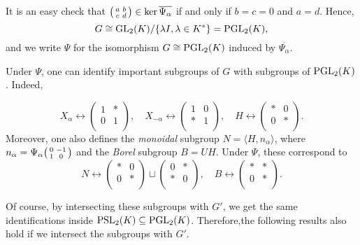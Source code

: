 It is an easy check that $\begin{psmallmatrix}
    a & b\\
    c & d\\
\end{psmallmatrix}\in\ker\overline{\Psi_\alpha}$ if and only if $b=c=0$ and $a=d$. Hence, $$G\cong\mathrm{GL}_2(K)/\{\lambda I,\lambda\in K^*\}=\mathrm{PGL}_2(K),$$
and we write $\Psi$ for the isomorphism $G\cong \mathrm{PGL}_2(K)$ induced by $\overline{\Psi_\alpha}$.


Under $\Psi$, one can identify important subgroups of $G$ with subgroups of $\mathrm{PGL}_2(K)$. Indeed,

$$X_\alpha \longleftrightarrow\begin{pmatrix}
    1 & *\\
    0 & 1\\
\end{pmatrix},\quad X_{-\alpha} \longleftrightarrow\begin{pmatrix}
    1 & 0\\
    * & 1\\
\end{pmatrix},\quad H\longleftrightarrow\begin{pmatrix}
    * & 0\\
    0 & *\\
\end{pmatrix}.$$
Moreover, one also defines the \textit{monoidal} subgroup $N=\langle H,n_\alpha\rangle$, where $n_\alpha=\Psi_\alpha\begin{psmallmatrix}
    0 & -1\\
    1 & 0\\
\end{psmallmatrix}$ and the \textit{Borel} subgroup $B=UH$. Under $\Psi$, these correspond to
$$N\longleftrightarrow\begin{pmatrix}
    * & 0\\
    0 & *\\
\end{pmatrix}\sqcup\begin{pmatrix}
    0 & *\\
    * & 0\\
\end{pmatrix},\quad B\longleftrightarrow\begin{pmatrix}
    * & *\\
    0 & *\\
\end{pmatrix}.$$

Of course, by intersecting these subgroups with $G'$, we get the same identifications inside $\mathrm{PSL}_2(K)\subseteq\mathrm{PGL}_2(K)$. Therefore,the following results also hold if we intersect the subgroups with $G'$.

